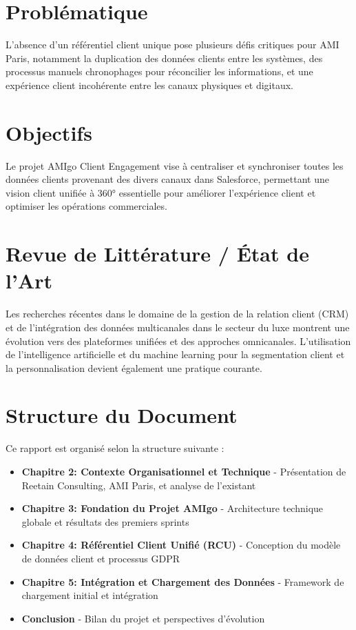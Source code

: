 \documentclass[12pt,a4paper,openany,oneside]{report}
\begin{document}
\section{Problématique}
\begin{mdframed}[backgroundcolor=lightgreen!20, linewidth=1pt]
L'absence d'un référentiel client unique pose plusieurs défis critiques pour AMI Paris, notamment la duplication des données clients entre les systèmes, des processus manuels chronophages pour réconcilier les informations, et une expérience client incohérente entre les canaux physiques et digitaux.
\end{mdframed}

\section{Objectifs}
Le projet AMIgo Client Engagement vise à centraliser et synchroniser toutes les données clients provenant des divers canaux dans Salesforce, permettant une vision client unifiée à 360° essentielle pour améliorer l'expérience client et optimiser les opérations commerciales.

\section{Revue de Littérature / État de l'Art}
Les recherches récentes dans le domaine de la gestion de la relation client (CRM) et de l'intégration des données multicanales dans le secteur du luxe montrent une évolution vers des plateformes unifiées et des approches omnicanales. L'utilisation de l'intelligence artificielle et du machine learning pour la segmentation client et la personnalisation devient également une pratique courante.

\section{Structure du Document}
Ce rapport est organisé selon la structure suivante :
\begin{itemize}
    \item \textbf{Chapitre 2: Contexte Organisationnel et Technique} - Présentation de Reetain Consulting, AMI Paris, et analyse de l'existant
    \item \textbf{Chapitre 3: Fondation du Projet AMIgo} - Architecture technique globale et résultats des premiers sprints
    \item \textbf{Chapitre 4: Référentiel Client Unifié (RCU)} - Conception du modèle de données client et processus GDPR
    \item \textbf{Chapitre 5: Intégration et Chargement des Données} - Framework de chargement initial et intégration
    \item \textbf{Conclusion} - Bilan du projet et perspectives d'évolution
\end{itemize}
\end{document}
